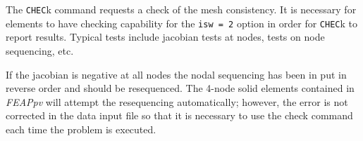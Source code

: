 \headb

The {\tt CHEC}k command requests a check of the mesh
consistency.  It is necessary for elements to have checking
capability for the {\tt isw = 2} option in order for {\tt CHEC}k to
report results.  Typical tests include jacobian tests at
nodes, tests on node sequencing, etc.

If the jacobian is negative at all nodes the nodal sequencing has been
in put in reverse order and should be resequenced.  The 4-node solid
elements contained in {\sl FEAPpv} will attempt the resequencing automatically;
however, the error is not corrected in the data input file so that it is
necessary to use the check command each time the problem is executed.
\vfill\eject
